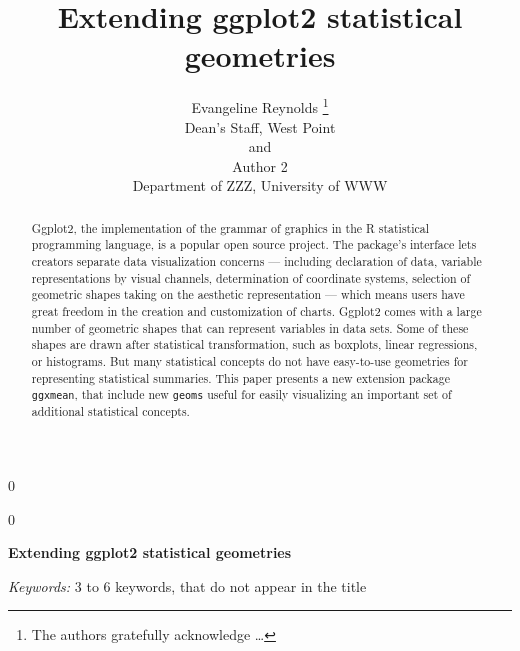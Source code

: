 \documentclass[12pt]{article}
\newcommand{\blind}{0}
\begin{document}
\def\spacingset#1{\renewcommand{\baselinestretch}%
{#1}\small\normalsize} \spacingset{1}



\blind
{
  \title{\bf Extending ggplot2 statistical geometries}

  \author{
        Evangeline Reynolds \thanks{The authors gratefully acknowledge
\ldots{}} \\
    Dean's Staff, West Point\\
     and \\     Author 2 \\
    Department of ZZZ, University of WWW\\
      }
  \maketitle
} \fi

\blind
{
  \bigskip
  \bigskip
  \bigskip
  \begin{center}
    {\LARGE\bf Extending ggplot2 statistical geometries}
  \end{center}
  \medskip
} \fi

\bigskip
\begin{abstract}
Ggplot2, the implementation of the grammar of graphics in the R
statistical programming language, is a popular open source project. The
package's interface lets creators separate data visualization concerns
--- including declaration of data, variable representations by visual
channels, determination of coordinate systems, selection of geometric
shapes taking on the aesthetic representation --- which means users have
great freedom in the creation and customization of charts. Ggplot2 comes
with a large number of geometric shapes that can represent variables in
data sets. Some of these shapes are drawn after statistical
transformation, such as boxplots, linear regressions, or histograms. But
many statistical concepts do not have easy-to-use geometries for
representing statistical summaries. This paper presents a new extension
package \texttt{ggxmean}, that include new \texttt{geoms} useful for
easily visualizing an important set of additional statistical concepts.
\end{abstract}

\noindent%
{\it Keywords:} 3 to 6 keywords, that do not appear in the title
\vfill

\newpage
\spacingset{1.45} %
\end{document}
